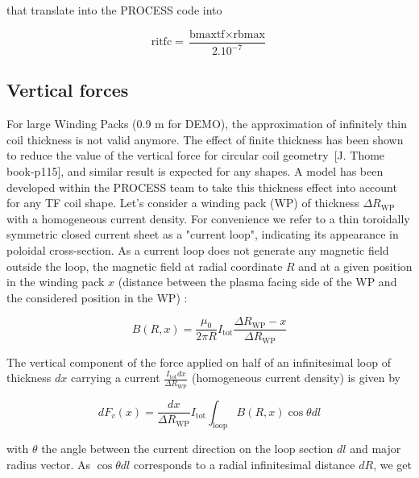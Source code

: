 \documentclass[hidelinks]{article}
\numberwithin{equation}{section}
\begin{document}
    \noi that translate into the PROCESS code into

    \begin{equation}\label{eq: ritfc}
        \text{ritfc} = \frac{\text{bmaxtf} \times \text{rbmax}}{2.10^{-7}} 
    \end{equation}


    \subsection{Vertical forces}

    \noi For large Winding Packs (0.9 m for DEMO), the approximation of infinitely thin coil thickness
    is not valid anymore. The effect of finite thickness has been shown to reduce the value of the 
    vertical force for circular coil geometry~[J. Thome book-p115], and similar result is 
    expected for any shapes. A model has been developed within the PROCESS team to take this thickness 
    effect into account for any TF coil shape. Let’s consider a winding pack (WP) of thickness
    $\Delta R_\mathrm{WP}$ with a homogeneous current density. For convenience we refer to a thin toroidally
    symmetric closed current sheet as a "current loop", indicating its appearance in poloidal cross-section. 
    As a current loop does not generate any magnetic field outside the loop, the magnetic field at radial 
    coordinate $R$ and at a given position in the winding pack $x$ (distance between the plasma facing side 
    of the WP and the considered position in the WP) :
    
    \begin{equation}
        B(R,x)=\frac{\mu_0}{2\pi R} I_\mathrm{tot}  \frac{\Delta R_\mathrm{WP}-x}{\Delta R_\mathrm{WP}}
    \end{equation}
    
    \noi The vertical component of the force applied on half of an infinitesimal loop of thickness $dx$
    carrying a current $\frac{I_\mathrm{tot} dx}{\Delta R_\mathrm{WP}}$ (homogeneous current density) 
    is given by 
    
    \begin{equation}
        dF_v (x) = \frac{dx}{\Delta R_\mathrm{WP}} I_\mathrm{tot} \int_\mathrm{loop} B(R,x)\cos\theta dl
    \end{equation}

    \noi with $\theta$ the angle between the current direction on the loop section $dl$ and major
    radius vector. As $\cos\theta dl$ corresponds to a radial infinitesimal distance $dR$, we get 
    
\end{document}
